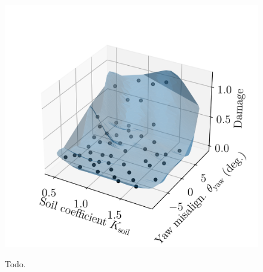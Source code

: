 \begin{figure}
    \centering
    \includegraphics[width=0.7\linewidth]{./part3/figures/OWT/3D_surrogate.png}
    \label{fig:3d_owt_surrogte}
    \caption{Todo.}
\end{figure}

